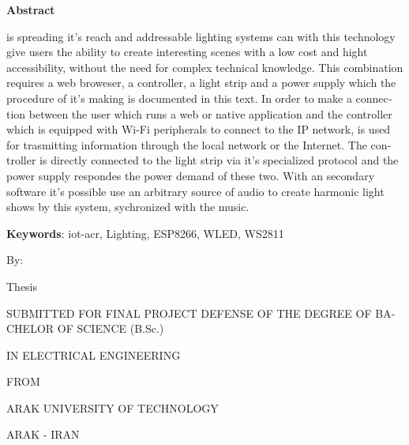 \newenvironment{bold}{\bfseries}{}

\clearpage
\thispagestyle{empty}

\begin{latin}

{\centering\textbf{Abstract}\par}

 is spreading it's reach and addressable lighting systems can with this technology give users the ability to create interesting scenes with a low cost and hight accessibility, without the need for complex technical knowledge. This combination requires a web broweser, a controller, a light strip and a power supply which the procedure of it's making is documented in this text. In order to make a connection between the user which runs a web or native application and the controller which is equipped with Wi-Fi peripherals to connect to the IP network,  is used for trasmitting information through the local network or the Internet. The controller is directly connected to the light strip via it's specialized protocol and the power supply respondes the power demand of these two. With an secondary software it's possible use an arbitrary source of audio to create harmonic light shows by this system, sychronized with the music.

\vspace{6mm}\textbf{Keywords}:
\gls{iot-acr},
Lighting,
ESP8266,
WLED,
WS2811

\clearpage
\thispagestyle{empty}

\begin{center}

\begin{bold}

\vspace*{15mm}\LARGE\titleen\par
\vspace{2cm}\normalsize By:

\Large\authoren

\onehalfspacing
\vspace{2cm}\large Thesis\par
SUBMITTED FOR FINAL PROJECT DEFENSE OF THE DEGREE OF BACHELOR OF SCIENCE (B.Sc.)\par IN ELECTRICAL ENGINEERING\par FROM\par ARAK UNIVERSITY OF TECHNOLOGY\par ARAK - IRAN
\end{bold}


\end{center}
\end{latin}
